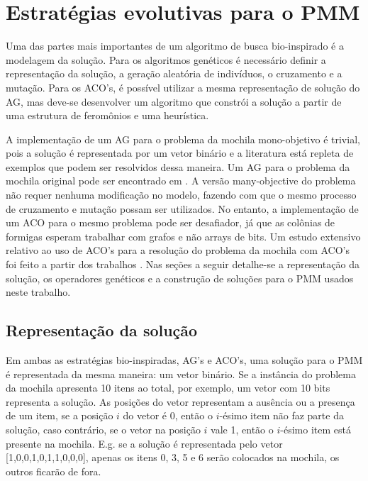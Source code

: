 \chapter[Estratégias evolutivas para o PMM]{Estratégias evolutivas para o PMM}

Uma das partes mais importantes de um algoritmo de busca bio-inspirado é a modelagem da solução. Para os algoritmos genéticos é necessário definir a representação da solução, a geração aleatória de indivíduos, o cruzamento e a mutação. Para os ACO's, é possível utilizar a mesma representação de solução do AG, mas deve-se desenvolver um algoritmo que constrói a solução a partir de uma estrutura de feromônios e uma heurística.

A implementação de um AG para o problema da mochila mono-objetivo é trivial, pois a solução é representada por um vetor binário e a literatura está repleta de exemplos que podem ser resolvidos dessa maneira. Um AG para o problema da mochila original pode ser encontrado em \cite{Hristakeva2013}. A versão many-objective do problema não requer nenhuma modificação no modelo, fazendo com que o mesmo processo de cruzamento e mutação possam ser utilizados. No entanto, a implementação de um ACO para o mesmo problema pode ser desafiador, já que as colônias de formigas esperam trabalhar com grafos e não arrays de bits. Um estudo extensivo relativo ao uso de ACO's para a resolução do problema da mochila com ACO's foi feito a partir dos trabalhos \cite{Ke2010,kong2008,changdar2013,Alaya2004,Alaya2007}. Nas seções a seguir detalhe-se a representação da solução, os operadores genéticos e a construção de soluções para o PMM usados neste trabalho.

\section{Representação da solução}
Em ambas as estratégias bio-inspiradas, AG's e ACO's, uma solução para o PMM é representada da mesma maneira: um vetor binário. Se a instância do problema da mochila apresenta 10 itens ao total, por exemplo, um vetor com 10 bits representa a solução. As posições do vetor representam a ausência ou a presença de um item, se a posição $i$ do vetor é 0, então o $i$-ésimo item não faz parte da solução, caso contrário, se o vetor na posição $i$ vale 1, então o  $i$-ésimo item está presente na mochila. E.g. se a solução é representada pelo vetor [1,0,0,1,0,1,1,0,0,0], apenas os itens 0, 3, 5 e 6 serão colocados na mochila, os outros ficarão de fora.

